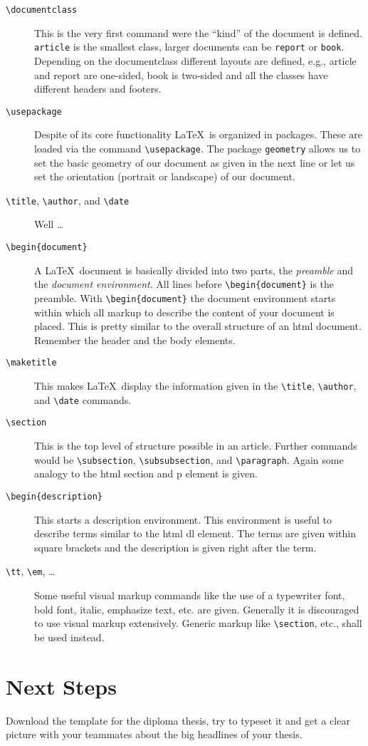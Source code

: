 \documentclass[11pt]{article}
\begin{document}
\begin{description}
	\item[{\tt \textbackslash documentclass}] This is the very first command were the ``kind'' of the document is defined. {\tt article} is the smallest class, larger documents can be {\tt report} or {\tt book}. Depending on the documentclass different layouts are defined, e.g., article and report are one-sided, book is two-sided and all the classes have different headers and footers.
	
	\item[{\tt \textbackslash usepackage}] Despite of its core functionality \LaTeX\ is organized in packages. These are loaded via the command {\tt \textbackslash usepackage}. The package {\tt geometry} allows us to set the basic geometry of our document as given in the next line or let us set the orientation (portrait or landscape) of our document.
	
	\item[{\tt \textbackslash title}, {\tt \textbackslash author}, and {\tt \textbackslash date}] Well \ldots
	
	\item[{\tt \textbackslash begin\{document\}}] A \LaTeX\ document is basically divided into two parts, the {\em preamble} and the {\em document environment}. All lines before {\tt \textbackslash begin\{document\}} is the preamble. With {\tt \textbackslash begin\{document\}} the document environment starts within which all markup to describe the content of your document is placed. This is pretty similar to the overall structure of an html document. Remember the header and the body elements.
	
	\item[{\tt \textbackslash maketitle}] This makes \LaTeX\ display the information given in the {\tt \textbackslash title}, {\tt \textbackslash author}, and {\tt \textbackslash date} commands.
	
	\item[{\tt \textbackslash section}]  This is the top level of structure possible in an article. Further commands would be {\tt \textbackslash subsection},  {\tt \textbackslash subsubsection}, and  {\tt \textbackslash paragraph}. Again some analogy to the html section and p element is given.
	
	\item[{\tt \textbackslash begin\{description\}}]  This starts a description environment. This environment is useful to describe terms similar to the html dl element. The terms are given within square brackets and the description is given right after the term.
	
	\item[{\tt \textbackslash tt}, {\tt \textbackslash em}, \ldots] Some useful visual markup commands like the use of  a typewriter font, bold font, italic, emphasize text, etc. are given. Generally it is discouraged to use visual markup extensively. Generic markup like {\tt \textbackslash section}, etc., shall be used instead.
\end{description}

\section{Next Steps}
Download the template for the diploma thesis, try to typeset it and get a clear picture with your teammates about the big headlines of your thesis.
\end{document}
